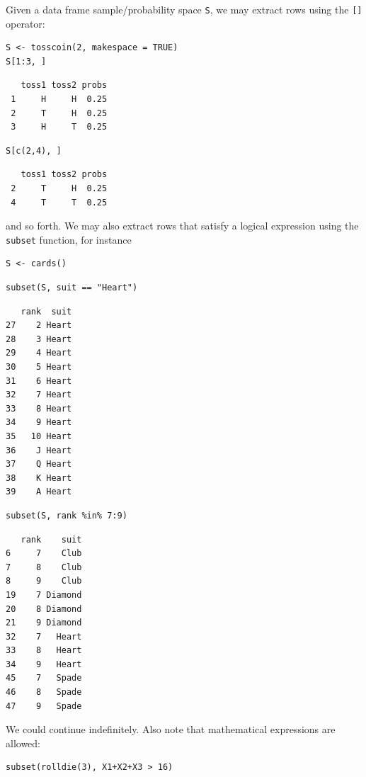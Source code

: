 \documentclass[captions=tableheading]{scrbook}
\begin{document}
Given a data frame sample/probability space \texttt{S}, we may extract rows using the \texttt{[]} operator: 


\begin{verbatim}
S <- tosscoin(2, makespace = TRUE) 
S[1:3, ]
\end{verbatim}

\begin{verbatim}
   toss1 toss2 probs
 1     H     H  0.25
 2     T     H  0.25
 3     H     T  0.25
\end{verbatim}


\begin{verbatim}
S[c(2,4), ]
\end{verbatim}

\begin{verbatim}
   toss1 toss2 probs
 2     T     H  0.25
 4     T     T  0.25
\end{verbatim}

and so forth. We may also extract rows that satisfy a logical expression using the \texttt{subset} function, for instance 


\begin{verbatim}
S <- cards()
\end{verbatim}


\begin{verbatim}
subset(S, suit == "Heart")
\end{verbatim}


\begin{verbatim}
   rank  suit
27    2 Heart
28    3 Heart
29    4 Heart
30    5 Heart
31    6 Heart
32    7 Heart
33    8 Heart
34    9 Heart
35   10 Heart
36    J Heart
37    Q Heart
38    K Heart
39    A Heart
\end{verbatim}


\begin{verbatim}
subset(S, rank %in% 7:9)
\end{verbatim}


\begin{verbatim}
   rank    suit
6     7    Club
7     8    Club
8     9    Club
19    7 Diamond
20    8 Diamond
21    9 Diamond
32    7   Heart
33    8   Heart
34    9   Heart
45    7   Spade
46    8   Spade
47    9   Spade
\end{verbatim}

We could continue indefinitely. Also note that mathematical expressions are allowed: 


\begin{verbatim}
subset(rolldie(3), X1+X2+X3 > 16)
\end{verbatim}
\end{document}
